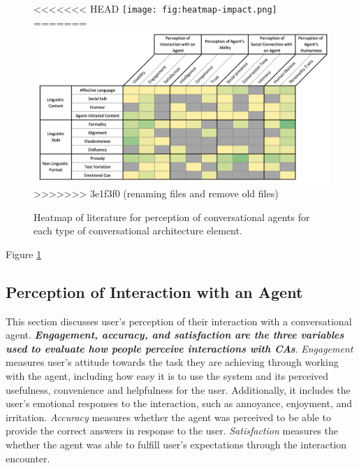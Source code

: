 \documentclass[sigconf,screen,review, anonymous]{acmart}
\begin{document}
\begin{figure}[h]
  \centering
<<<<<<< HEAD
  \texttt{[image: fig:heatmap-impact.png]}
=======
  \includegraphics[width=\textwidth]{fig-heatmap-impact.png}
>>>>>>> 3e1f3f0 (renaming files and remove old files)
  \caption{Heatmap of literature for perception of conversational agents for each type of conversational architecture element.}
  \label{fig:heatmap-impact}
\end{figure}

Figure \ref{fig:heatmap-impact}


\subsection{Perception of Interaction with an Agent}

This section discusses user's perception of their interaction with a conversational agent. \textbf{\textit{Engagement, accuracy, and satisfaction are the three variables used to evaluate how people perceive interactions with CAs}}. \textit{Engagement} measures user's attitude towards the task they are achieving through working with the agent, including how easy it is to use the system and its perceived usefulness, convenience and helpfulness for the user. Additionally, it includes the user's emotional responses to the interaction, such as annoyance, enjoyment, and irritation. \textit{Accuracy} measures whether the agent was perceived to be able to provide the correct answers in response to the user. \textit{Satisfaction} measures the whether the agent was able to fulfill user's expectations through the interaction encounter.
\end{document}
